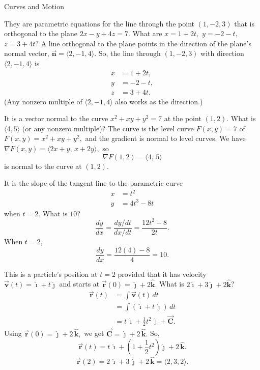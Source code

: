 \documentclass{article}
\newcommand{\bvec}[1]{\vec{\mathbf{#1}}}
\newcommand{\uveci}{\boldsymbol{\hat{\imath}}}
\newcommand{\uvecj}{\boldsymbol{\hat{\jmath}}}
\newcommand{\uveck}{\boldsymbol{\hat{k}}}
\begin{document}
\begin{category}{Curves and Motion}

  \begin{clue}[write]
    They are parametric equations for the line through the point $(1,-2,3)$ that is orthogonal to the plane $2x-y+4z=7.$
  \response
    What are $x=1+2t,$ $y=-2-t,$ $z=3+4t$?
  \solution
    A line orthogonal to the plane points in the direction of the plane's normal vector, $\bvec{n}=\langle 2,-1,4\rangle.$ So, the line through $(1,-2,3)$ with direction $\langle 2,-1,4\rangle$ is
    \begin{align*}
    x&=1+2t, \\
    y&=-2-t, \\
    z&=3+4t.
    \end{align*}
    (Any nonzero multiple of $\langle 2,-1,4\rangle$ also works as the direction.)
  \end{clue}

  \begin{clue}[say]
    It is a vector normal to the curve $x^2+xy+y^2=7$ at the point $(1,2).$
  \response
    What is $\langle 4,5\rangle$ (or any nonzero multiple)?
  \solution
    The curve is the level curve $F(x,y)=7$ of $F(x,y)=x^2+xy+y^2,$ and the gradient is normal to level curves. We have $\nabla F(x,y)=\langle 2x+y,\,x+2y\rangle,$ so
    \[
    \nabla F(1,2)=\langle 4,\,5\rangle
    \]
    is normal to the curve at $(1,2).$
  \end{clue}

  \begin{clue}[say]
    It is the slope of the tangent line to the parametric curve
    \begin{align*}
    x&=t^2\\
    y&=4t^3-8t
    \end{align*}
    when $t=2.$
  \response
    What is $10$?
  \solution
    \[
    \frac{dy}{dx}=\frac{dy/dt}{dx/dt}=\frac{12t^2-8}{2t}.
    \]
    When $t=2,$
    \[
    \frac{dy}{dx}=\frac{12(4)-8}{4}=10.
    \]
  \end{clue}

  \begin{clue}[write]
    This is a particle's position at $t=2$ provided that it has velocity $\bvec{v}(t) = \uveci + t \uvecj$ and starts at $\bvec{r}(0) = \uvecj + 2\uveck.$
  \response
    What is $2 \uveci + 3 \uvecj + 2 \uveck$?
  \solution
    \begin{align*}
    \bvec{r}(t)
    &=\int \bvec{v}(t)\,dt \\
    &=\int (\uveci+t\,\uvecj)\,dt \\
    &=t\,\uveci+\frac{1}{2}t^2\,\uvecj+\bvec{C}.
    \end{align*}
    Using $\bvec{r}(0)=\uvecj+2\,\uveck,$ we get $\bvec{C}=\uvecj+2\,\uveck.$ So,
    \[
    \bvec{r}(t)=t\,\uveci+\left(1+\frac{1}{2}t^2\right)\uvecj+2\,\uveck.
    \]
    \[
    \bvec{r}(2)=2\,\uveci+3\,\uvecj+2\,\uveck=\langle 2, 3, 2 \rangle.
    \]
  \end{clue}


\end{category}
\end{document}
